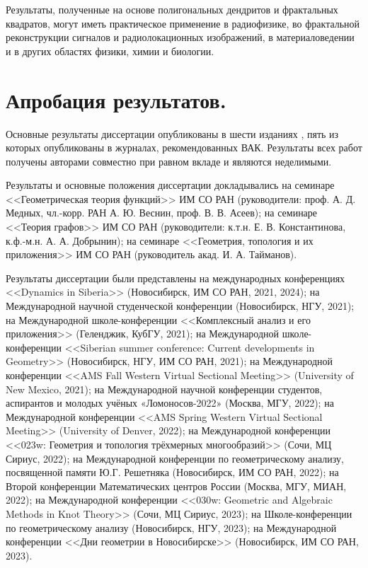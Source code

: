 \documentclass[a5paper,9pt,twoside]{extarticle} %
\begin{document}
Результаты, полученные на основе полигональных дендритов и фрактальных квадратов, могут иметь практическое применение в радиофизике, во фрактальной реконструкции сигналов и радиолокационных изображений, в материаловедении и в других областях физики, химии и биологии.


\section{Апробация результатов.}

Основные результаты диссертации опубликованы в шести изданиях \cite{DST2021, DST2022, DT2024fqd, TD2022fs, TD2023fs, VDT2020}, пять из которых \cite{DST2021, DST2022, DT2024fqd, TD2023fs, VDT2020} опубликованы в журналах, рекомендованных ВАК.
Результаты всех работ получены авторами совместно при равном вкладе и являются неделимыми.

Результаты и основные положения диссертации докладывались на семинаре <<Геометрическая теория функций>> ИМ СО РАН (руководители:
проф. А. Д. Медных, чл.-корр. РАН А. Ю. Веснин, проф. В. В. Асеев); на семинаре <<Теория графов>> ИМ СО РАН (руководители: к.т.н. Е. В. Константинова, к.ф.-м.н. А. А. Добрынин); на семинаре <<Геометрия, топология и их приложения>> ИМ СО РАН (руководитель акад. И. А. Тайманов).

Результаты диссертации были представлены на международных конференциях <<Dynamics in Siberia>> (Новосибирск, ИМ СО РАН, 2021, 2024); 
на Международной научной студенческой конференции (Новосибирск, НГУ, 2021);
на Международной школе-конференции <<Комплексный анализ и его приложения>> (Геленджик, КубГУ, 2021); 
на Международной школе-конференции <<Siberian summer conference: Current developments in Geometry>> (Новосибирск, НГУ, ИМ СО РАН, 2021); 
на Международной конференции <<AMS Fall Western Virtual Sectional Meeting>> (University of New Mexico, 2021); 
на Международной научной конференции студентов, аспирантов и молодых учёных «Ломоносов-2022» (Москва, МГУ, 2022); 
на Международной конференции <<AMS Spring Western Virtual Sectional Meeting>> (University of Denver, 2022); 
на Международной конференции <<023w: Геометрия и топология трёхмерных многообразий>> (Сочи, МЦ Сириус, 2022); 
на Международной конференции по геометрическому анализу, посвященной памяти Ю.Г. Решетняка (Новосибирск, ИМ СО РАН, 2022); 
на Второй конференции Математических центров России (Москва, МГУ, МИАН, 2022); 
на Международной конференции <<030w: Geometric and Algebraic Methods in Knot Theory>> (Сочи, МЦ Сириус, 2023);
на Школе-конференции по геометрическому анализу
(Новосибирск, НГУ, 2023);
на Международной конференции <<Дни геометрии в Новосибирске>> (Новосибирск, ИМ СО РАН, 2023).
\end{document}
